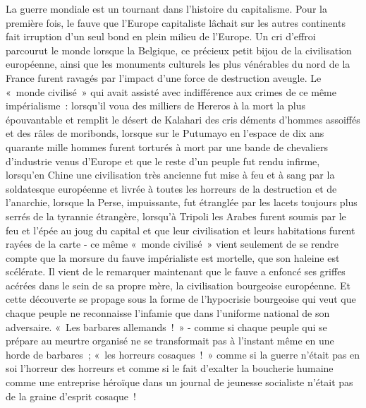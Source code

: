 \documentclass[french,twoside]{book} %
\begin{document}
La guerre mondiale est un tournant dans l’histoire du capitalisme. Pour la première fois, le fauve que l’Europe capitaliste lâchait sur les autres continents fait irruption d’un seul bond en plein milieu de l’Europe. Un cri d’effroi parcourut le monde lorsque la Belgique, ce précieux petit bijou de la civilisation européenne, ainsi que les monuments culturels les plus vénérables du nord de la France furent ravagés par l’impact d’une force de destruction aveugle. Le « monde civilisé » qui avait assisté avec indifférence aux crimes de ce même impérialisme : lorsqu’il voua des milliers de Hereros à la mort la plus épouvantable et remplit le désert de Kalahari des cris déments d’hommes assoiffés et des râles de moribonds, lorsque sur le Putumayo en l’espace de dix ans quarante mille hommes furent torturés à mort par une bande de chevaliers d’industrie venus d’Europe et que le reste d’un peuple fut rendu infirme, lorsqu’en Chine une civilisation très ancienne fut mise à feu et à sang par la soldatesque européenne et livrée à toutes les horreurs de la destruction et de l’anarchie, lorsque la Perse, impuissante, fut étranglée par les lacets toujours plus serrés de la tyrannie étrangère, lorsqu’à Tripoli les Arabes furent soumis par le feu et l’épée au joug du capital et que leur civilisation et leurs habitations furent rayées de la carte - ce même « monde civilisé » vient seulement de se rendre compte que la morsure du fauve impérialiste est mortelle, que son haleine est scélérate. Il vient de le remarquer maintenant que le fauve a enfoncé ses griffes acérées dans le sein de sa propre mère, la civilisation bourgeoise européenne. Et cette découverte se propage sous la forme de l’hypocrisie bourgeoise qui veut que chaque peuple ne reconnaisse l’infamie que dans l’uniforme national de son adversaire. « Les barbares allemands ! » - comme si chaque peuple qui se prépare au meurtre organisé ne se transformait pas à l’instant même en une horde de barbares ; « les horreurs cosaques ! » comme si la guerre n’était pas en soi l’horreur des horreurs et comme si le fait d’exalter la boucherie humaine comme une entreprise héroïque dans un journal de jeunesse socialiste n’était pas de la graine d’esprit cosaque !\par
\end{document}
